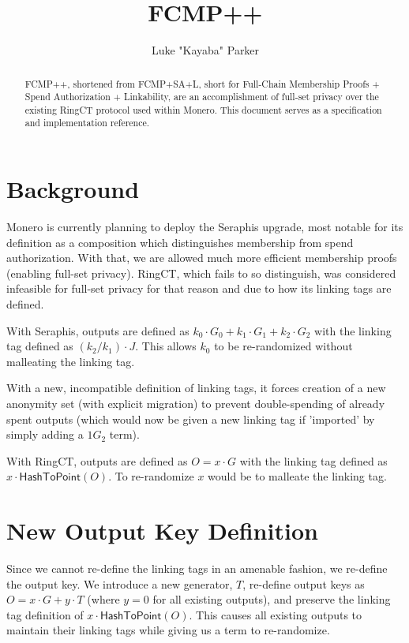 \documentclass[]{article}
\title{FCMP++}
\author{Luke "Kayaba" Parker}
\begin{document}
\maketitle

\begin{abstract}
	
	FCMP++, shortened from FCMP+SA+L, short for Full-Chain Membership Proofs + Spend Authorization + Linkability, are an accomplishment of full-set privacy over the existing RingCT protocol used within Monero. This document serves as a specification and implementation reference.

\end{abstract}

\section{Background}

\newcommand{\hashtopoint}{\mathsf{HashToPoint}}

Monero is currently planning to deploy the Seraphis upgrade, most notable for its definition as a composition which distinguishes membership from spend authorization. With that, we are allowed much more efficient membership proofs (enabling full-set privacy). RingCT, which fails to so distinguish, was considered infeasible for full-set privacy for that reason and due to how its linking tags are defined.

With Seraphis, outputs are defined as $k_0 \cdot G_0 + k_1 \cdot G_1 + k_2 \cdot G_2$ with the linking tag defined as $(k_2 / k_1) \cdot J$. This allows $k_0$ to be re-randomized without malleating the linking tag.

With a new, incompatible definition of linking tags, it forces creation of a new anonymity set (with explicit migration) to prevent double-spending of already spent outputs (which would now be given a new linking tag if 'imported' by simply adding a $1 G_2$ term).

With RingCT, outputs are defined as $O = x \cdot G$ with the linking tag defined as $x \cdot \hashtopoint(O)$. To re-randomize $x$ would be to malleate the linking tag.

\section{New Output Key Definition}

Since we cannot re-define the linking tags in an amenable fashion, we re-define the output key. We introduce a new generator, $T$, re-define output keys as $O = x \cdot G + y \cdot T$ (where $y = 0$ for all existing outputs), and preserve the linking tag definition of $x \cdot \hashtopoint(O)$. This causes all existing outputs to maintain their linking tags while giving us a term to re-randomize.
\end{document}
